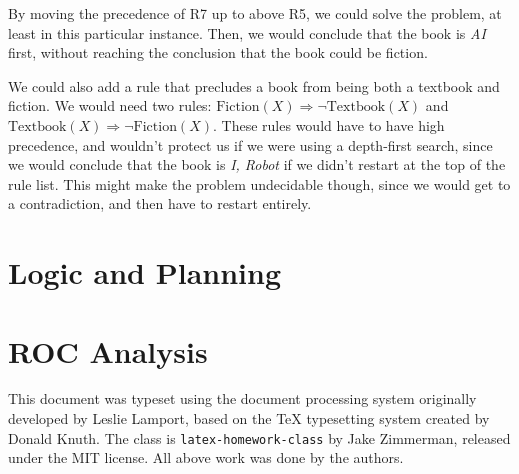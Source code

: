 \documentclass[11pt,largemargins, anonymous]{homework}
\begin{document}
By moving the precedence of R7 up to above R5, we could solve the problem,
at least in this particular instance.
Then, we would conclude that the book is \textit{AI} first,
without reaching the conclusion that the book could be fiction.

We could also add a rule that precludes a book from being both a textbook and fiction.
We would need two rules: $\mathrm{Fiction}(X) \Rightarrow \neg \mathrm{Textbook}(X)$ and $\mathrm{Textbook}(X) \Rightarrow \neg \mathrm{Fiction}(X)$. These rules would have to have high precedence,
and wouldn't protect us if we were using a depth-first search,
since we would conclude that the book is \textit{I, Robot} if we didn't restart at the top of the rule list.
This might make the problem undecidable though,
since we would get to a contradiction,
and then have to restart entirely.

\part{Logic and Planning}

\part{ROC Analysis}


\begin{colophon}
    This document was typeset using the \LaTeXe{} document processing system
    originally developed by Leslie Lamport, based on the \TeX{} typesetting system
    created by Donald Knuth.
    The class is \texttt{latex-homework-class} by Jake Zimmerman,
    released under the MIT license.
    All above work was done by the authors.
\end{colophon}
\end{document}

